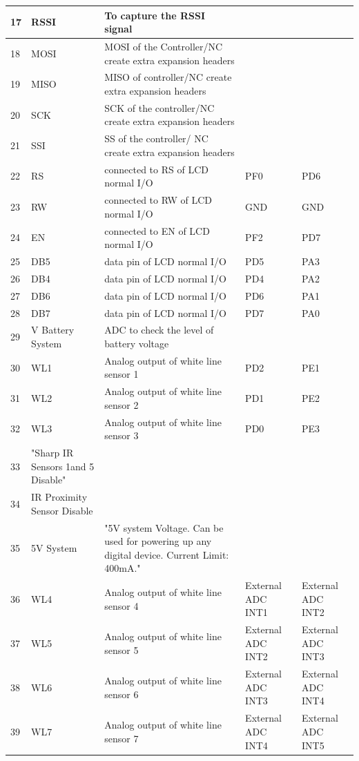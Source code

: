 \documentclass[a4paper,10pt,oneside]{article}
\begin{document}
{\begin{longtable}{|p{}|p{}|p{}|p{}|p{}|}
				17&	RSSI&	To capture the RSSI signal& &\\ \hline	
				18&	MOSI&	MOSI of the Controller/NC create extra expansion headers& &\\ \hline	
				19&	MISO&	MISO of controller/NC create extra expansion headers & &\\ \hline
				20&	SCK&	SCK of the controller/NC create extra expansion headers&&	\\ \hline
				21&	SSI	&SS of the controller/ NC create extra expansion headers	&&\\ \hline
				22&	RS&	connected to RS of LCD normal I/O&	PF0 & PD6\\ \hline
				23&	RW&	connected to RW of LCD normal I/O&	GND & GND\\ \hline
				24&	EN&	connected to EN of LCD normal I/O&	PF2 & PD7\\ \hline
				25&	DB5	&data pin of LCD normal I/O	&PD5 & PA3\\ \hline
				26&	DB4&	data pin of LCD normal I/O&	PD4 & PA2\\ \hline
				27&	DB6	&data pin of LCD normal I/O	&PD6 & PA1\\ \hline
				28&	DB7	&data pin of LCD normal I/O	&PD7 & PA0\\ \hline
				29&	V Battery System&	ADC to check the level of battery voltage &	&\\ \hline
				30&	WL1&	Analog output of white line sensor 1	&PD2 & PE1\\ \hline
				31&	WL2&	Analog output of white line sensor 2&	PD1 & PE2\\ \hline
				32&	WL3&	Analog output of white line sensor 3&	PD0 & PE3\\ \hline
				33&	"Sharp IR Sensors 1and 5 Disable" & &	&	\\ \hline
				34&	IR Proximity Sensor Disable& & &	\\ \hline	
				35&	5V System&	"5V system Voltage. Can be used for powering
				up any digital device. Current Limit: 400mA." && \\ \hline
				36&	WL4&	Analog output of white line sensor 4&	External ADC INT1&	External ADC INT2\\ \hline
				37&	WL5&	Analog output of white line sensor 5&	External ADC INT2&	External ADC INT3\\ \hline
				38&	WL6&	Analog output of white line sensor 6	&External ADC INT3&	External ADC INT4\\ \hline
				39&	WL7&	Analog output of white line sensor 7&	External ADC INT4&	External ADC INT5\\ \hline

\end{longtable}}
\end{document}
